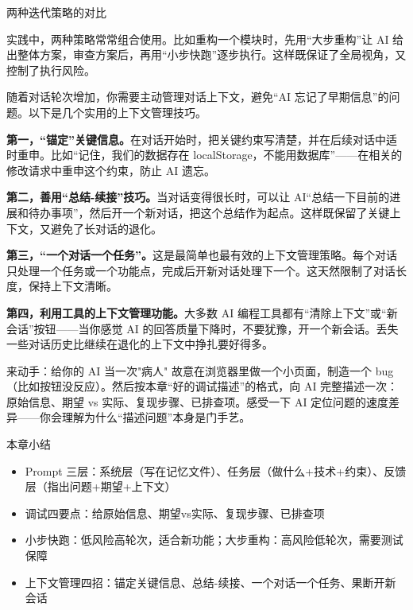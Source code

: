 \begin{center}\small\color{gray}两种迭代策略的对比\end{center}

实践中，两种策略常常组合使用。比如重构一个模块时，先用“大步重构”让 AI 给出整体方案，审查方案后，再用“小步快跑”逐步执行。这样既保证了全局视角，又控制了执行风险。


随着对话轮次增加，你需要主动管理对话上下文，避免“AI 忘记了早期信息”的问题。以下是几个实用的上下文管理技巧。

\textbf{第一，“锚定”关键信息。}在对话开始时，把关键约束写清楚，并在后续对话中适时重申。比如“记住，我们的数据存在 localStorage，不能用数据库”——在相关的修改请求中重申这个约束，防止 AI 遗忘。

\textbf{第二，善用“总结-续接”技巧。}当对话变得很长时，可以让 AI“总结一下目前的进展和待办事项”，然后开一个新对话，把这个总结作为起点。这样既保留了关键上下文，又避免了长对话的退化。

\textbf{第三，“一个对话一个任务”。}这是最简单也最有效的上下文管理策略。每个对话只处理一个任务或一个功能点，完成后开新对话处理下一个。这天然限制了对话长度，保持上下文清晰。

\textbf{第四，利用工具的上下文管理功能。}大多数 AI 编程工具都有“清除上下文”或“新会话”按钮——当你感觉 AI 的回答质量下降时，不要犹豫，开一个新会话。丢失一些对话历史比继续在退化的上下文中挣扎要好得多。

\begin{tcbpractice}{来动手：给你的 AI 当一次"病人"}
故意在浏览器里做一个小页面，制造一个 bug（比如按钮没反应）。然后按本章“好的调试描述”的格式，向 AI 完整描述一次：原始信息、期望 vs 实际、复现步骤、已排查项。感受一下 AI 定位问题的速度差异——你会理解为什么“描述问题”本身是门手艺。

\end{tcbpractice}

\begin{tcbsummary}{本章小结}
\begin{itemize}
  \item Prompt 三层：系统层（写在记忆文件）、任务层（做什么+技术+约束）、反馈层（指出问题+期望+上下文）
  \item 调试四要点：给原始信息、期望vs实际、复现步骤、已排查项
  \item 小步快跑：低风险高轮次，适合新功能；大步重构：高风险低轮次，需要测试保障
  \item 上下文管理四招：锚定关键信息、总结-续接、一个对话一个任务、果断开新会话
\end{itemize}

\end{tcbsummary}
